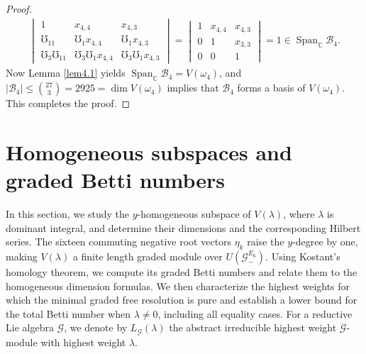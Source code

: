 \documentclass[12pt]{article}
\numberwithin{equation}{section}
\theoremstyle{definition}
\theoremstyle{remark}
\begin{document}
\begin{proof}
\begin{eqnarray}
\begin{vmatrix}
 			1&x_{4,4}&x_{4,3}\\
 			\mho_11&\mho_1x_{4,4}&\mho_1x_{4,3}\\
 			\mho_3\mho_11&\mho_3\mho_1x_{4,4}&\mho_3\mho_1x_{4,3}
 		\end{vmatrix}=\begin{vmatrix}
 		1&x_{4,4}&x_{4,3}\\
 		0&1&x_{3,3}\\
 		0&0&1
 		\end{vmatrix}=1\in\operatorname{Span}_{\mathbb{C}}\mathcal{B}_4.
 	\end{eqnarray}
 	Now Lemma \ref{lem4.1} yields $\operatorname{Span}_{\mathbb{C}}\mathcal{B}_4=V(\omega_4)$, and $|\mathcal B_4|\leqslant \binom{27}{3}=2925=\dim V(\omega_4)$ implies that $\mathcal{B}_4$ forms a basis of $V(\omega_4)$. This completes the proof.
 	
\end{proof}







\section{Homogeneous subspaces and graded Betti numbers} \label{section5}

In this section, we study the $y$-homogeneous subspace of $V(\lambda)$, where $\lambda$ is dominant integral, and determine their dimensions and the corresponding Hilbert series. The sixteen commuting negative root vectors $\eta_k$ raise the $y$-degree by one, making $V(\lambda)$ a finite length graded module over $U(\mathscr{G}^{E_6}_-)$. Using Kostant's homology theorem, we compute its graded Betti numbers and relate them to the homogeneous dimension formulas. We then characterize the highest weights for which the minimal graded free resolution is pure and establish a lower bound for the total Betti number when $\lambda\neq 0$, including all equality cases. For a reductive Lie algebra $\mathscr{G}$, we denote by $L_{\mathscr{G}}(\lambda)$ the abstract irreducible highest weight $\mathscr{G}$-module with highest weight $\lambda$.
\end{document}
